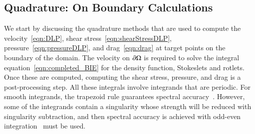\documentclass[preprint, 10pt]{elsarticle}
\begin{document}
\subsection{Quadrature: On Boundary Calculations} 
\label{sec:on_boundary}
We start by discussing the quadrature methods that are used to compute
the velocity~\eqref{eqn:DLP}, shear stress~\eqref{eqn:shearStressDLP},
pressure~\eqref{eqn:pressureDLP}, and drag~\eqref{eqn:drag} at target
points on the boundary of the domain.  The velocity on ${\partial}\Omega$ is
required to solve the integral equation~\eqref{eqn:completed_BIE} for
the density function, Stokeslets and rotlets.  Once these are computed,
computing the shear stress, pressure, and drag is a post-processing
step.  All these integrals involve integrands that are periodic.  For
smooth integrands, the trapezoid rule guarantees spectral
accuracy~\cite{tre-wei2014}.  However, some of the integrands contain a
singularity whose strength will be reduced with singularity subtraction,
and then spectral accuracy is achieved with odd-even
integration~\cite{sid-isr1988} must be used.

\end{document}
